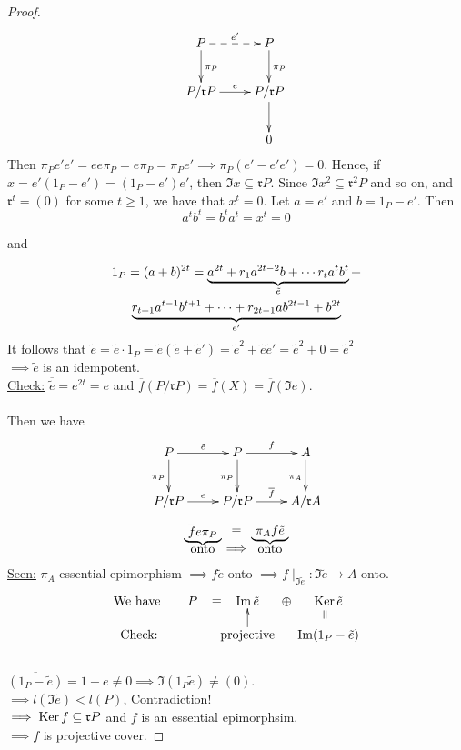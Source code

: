 \begin{thm}
\begin{proof}
\[
\xymatrix{
P\ar@{-->}[r]^{e'} \ar[d]^{\pi_P} & P \ar[d]^{\pi_P}\\
P/\mathfrak{r}P \ar[r]^e & P/\mathfrak{r}P \ar[d]\\
&0
}
\]
Then $\pi_P e'e' = ee\pi_P = e\pi_P = \pi_P e' \implies \pi_P(e'-e'e')
= 0$. Hence, if $x = e'(1_P - e') = (1_P-e')e'$, then $\Im x \subseteq
\mathfrak{r}P$. Since $\Im x^2 \subseteq \mathfrak{r}^2 P$ and so on,
and $\mathfrak{r}^t = (0)$ for some $t \geq 1$, we have that $x^t =
0$. Let $a = e'$ and $b = 1_P - e'$. Then $$a^tb^t = b^ta^t = x^t =
0$$ \centerline{and}
\begin{multline}
1_P = (a+b)^{2t} = \underbrace{a^{2t} + r_1a^{2t-2}b + \cdots
  r_ta^tb^t}_{\tilde{e}} +\notag\\
 \underbrace{r_{t+1}a^{t-1}b^{t+1} + \cdots + r_{2t-1}ab^{2t-1} +
   b^{2t}}_{\tilde{e}'}
\end{multline}
It follows that $\tilde{e} = \tilde{e}\cdot 1_P = \tilde{e}(\tilde{e} + \tilde{e}') = \tilde{e}^2 + \tilde{e}\tilde{e}' = \tilde{e}^2 + 0 = \tilde{e}^2$\\
$\implies \tilde{e}$ is an idempotent.\\
\underline{Check:} $\overline{\tilde{e}} = e^{2t} = e$ and $\overline{f}(P/\mathfrak{r}P) = \overline{f}(X) = \overline{f}(\Im e)$.\\
\leavevmode\\
Then we have 
\[
\xymatrix{
P \ar[r]^{\tilde{e}} \ar[d]_{\pi_P} & P \ar[r]^{f} \ar[d]_{\pi_P} & A \ar[d]_{\pi_A}\\
P/\mathfrak{r}P \ar[r]^e & P/\mathfrak{r}P \ar[r]^{\overline{f}} & A/\mathfrak{r}A
}
\]
\[\xymatrix@R-2pc{
*+[F_\}]{\overline{f}e \pi_P} \ar@{}[r]|-*[@]{=} & *+[F_\}]{\pi_A f \tilde{e}}\\
\text{onto} \ar@{}[r]|-*[@]{\implies} & \text{onto} 
}\]
\underline{Seen:} $\pi_A$ essential epimorphism $\implies f \tilde{e}$ onto $\implies f \mid_{\Im \tilde{e}}: \Im \tilde{e} \to A$ onto.\\

$$\xymatrix@R-1pc@C-1pc{
\text{We have } & P \ar@{}[r]|-*[@]{=} & \Im \tilde{e} \ar@{}[r]|-*[@]{\oplus} & \Ker \tilde{e}\\
\text{Check:} && \text{projective} \ar[u] & \Im(1_P - \tilde{e}) \ar@{}[u]|-*[@]{=}
}$$\\
$\overline{(1_P - \tilde{e})} = 1 - e \neq 0 \implies \Im (1_P \tilde{e}) \neq (0)$.\\
$\implies l(\Im \tilde{e}) < l(P)$, Contradiction!\\
$\implies \operatorname{Ker}\nolimits f \subseteq \mathfrak{r}P$ and $f$ is an essential epimorphsim.\\
$\implies f$ is projective cover.


\end{proof}
\end{thm}
